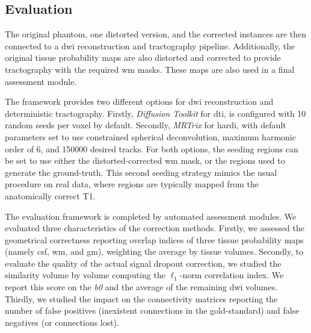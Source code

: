 \subsection{Evaluation}
\label{sec:evaluation}
The original phantom, one distorted version, and
the corrected instances are then connected to a
\gls*{dwi} reconstruction and tractography pipeline.
Additionally, the original tissue probability maps
are also distorted and corrected to provide tractography
with the required \gls*{wm} masks.
These maps are also used in a final assessment module.

The framework provides two different options for
\gls*{dwi} reconstruction and deterministic tractography.
Firstly, \emph{Diffusion Toolkit} \cite{wang_diffusion_2007}
for \gls*{dti}, is configured with 10 random
seeds per voxel by default. Secondly, \emph{MRTrix}
\cite{tournier_mrtrix:_2012} for \gls*{hardi}, with
default parameters set to use constrained spherical
deconvolution, maximum harmonic order of 6, and 150000
desired tracks.
For both options, the seeding regions can be set to use
either the distorted-corrected \gls*{wm} mask, or the 
regions used to generate the ground-truth. This second
seeding strategy mimics the usual procedure on real 
data, where regions are typically mapped from the
anatomically correct T1.

The evaluation framework is completed by automated 
assessment modules. We evaluated three characteristics
of the correction methods. 
Firstly, we assessed the geometrical correctness
reporting overlap indices of three tissue
probability maps (namely \gls*{csf}, \gls*{wm},
and \gls*{gm}), weighting the average by tissue
volumes.
Secondly, to evaluate the quality of the actual 
signal dropout correction, we studied the 
similarity volume by volume computing the $\ell_1$-norm
correlation index. We report this score
on the \textit{b0} and the average of the remaining \gls*{dwi}
volumes. Thirdly, we studied the impact on the
connectivity matrices reporting the number of
false positives (inexistent connections in the
gold-standard) and false negatives (or connections
lost).